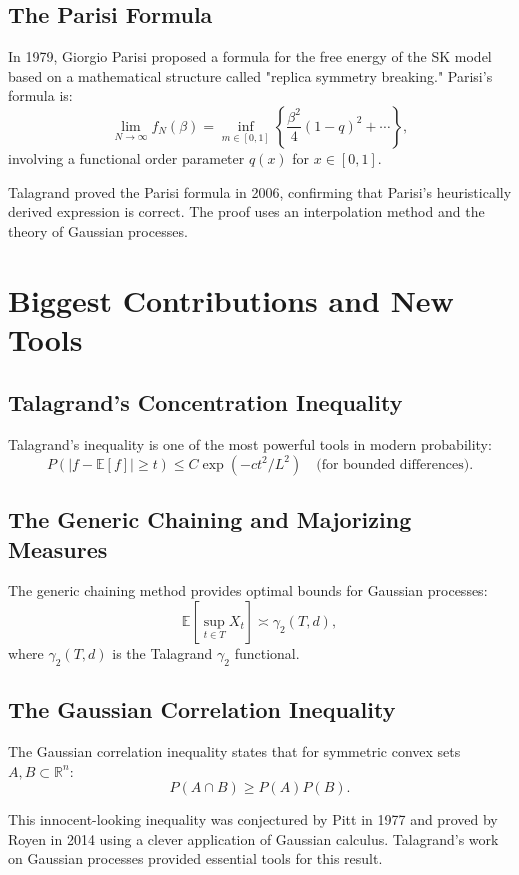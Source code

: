 \subsection{The Parisi Formula}

In 1979, Giorgio Parisi proposed a formula for the free energy of the SK model based on a mathematical structure called "replica symmetry breaking." Parisi's formula is:
\[
\lim_{N \to \infty} f_N(\beta) = \inf_{m \in [0,1]} \left\{ \frac{\beta^2}{4}(1 - q)^2 + \cdots \right\},
\]
involving a functional order parameter $q(x)$ for $x \in [0,1]$.

Talagrand proved the Parisi formula in 2006, confirming that Parisi's heuristically derived expression is correct. The proof uses an interpolation method and the theory of Gaussian processes.

\section{Biggest Contributions and New Tools}

\subsection{Talagrand's Concentration Inequality}

Talagrand's inequality is one of the most powerful tools in modern probability:
\[
P(|f - \mathbb{E}[f]| \geq t) \leq C \exp(-c t^2 / L^2) \quad \text{(for bounded differences)}.
\]

\subsection{The Generic Chaining and Majorizing Measures}

The generic chaining method provides optimal bounds for Gaussian processes:
\[
\mathbb{E}[\sup_{t \in T} X_t] \asymp \gamma_2(T, d),
\]
where $\gamma_2(T,d)$ is the Talagrand $\gamma_2$ functional.

\subsection{The Gaussian Correlation Inequality}

The Gaussian correlation inequality states that for symmetric convex sets $A, B \subset \mathbb{R}^n$:
\[
P(A \cap B) \geq P(A) P(B).
\]

This innocent-looking inequality was conjectured by Pitt in 1977 and proved by Royen in 2014 using a clever application of Gaussian calculus. Talagrand's work on Gaussian processes provided essential tools for this result.

